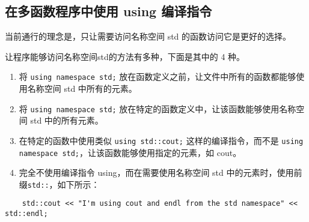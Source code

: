 \subsection{在多函数程序中使用 using 编译指令}
当前通行的理念是，只让需要访问名称空间 std 的函数访问它是更好的选择。

让程序能够访问名称空间std的方法有多种，下面是其中的 4 种。
\begin{enumerate}
    \item  将 \verb|using namespace std;| 放在函数定义之前，让文件中所有的函数都能够使用名称空间 std 中所有的元素。
    \item  将 \verb|using namespace std;| 放在特定的函数定义中，让该函数能够使用名称空间 std 中的所有元素。
    \item  在特定的函数中使用类似 \verb|using std::cout;| 这样的编译指令，而不是 \verb|using namespace std;|，让该函数能够使用指定的元素，如 cout。
    \item  完全不使用编译指令 using，而在需要使用名称空间 std 中的元素时，使用前缀\verb|std::|，如下所示：
\end{enumerate}
\begin{verbatim}
    std::cout << "I'm using cout and endl from the std namespace" << std::endl;
\end{verbatim}